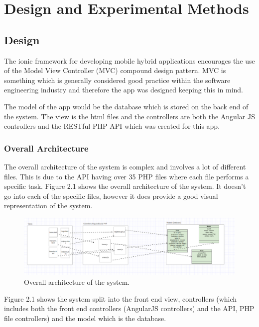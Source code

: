 \chapter{Design and Experimental Methods}
\section{Design}
The ionic framework for developing mobile hybrid applications encourages the use of the Model View Controller (MVC) compound design pattern. MVC is something which is generally considered good practice within the software engineering industry \cite{hybridcrap} and therefore the app was designed keeping this in mind.

The model of the app would be the database which is stored on the back end of the system. The view is the html files and the controllers are both the Angular JS controllers and the RESTful PHP API which was created for this app.

\subsection{Overall Architecture}
The overall architecture of the system is complex and involves a lot of different files. This is due to the API having over 35 PHP files where each file performs a specific task. Figure 2.1 shows the overall architecture of the system. It doesn't go into each of the specific files, however it does provide a good visual representation of the system.

\begin{center} 
\begin{figure}[H]
\includegraphics[width=\textwidth,height=\textheight,keepaspectratio]{images/overall}
\caption{Overall architecture of the system.}
\end{figure}
\end{center}

Figure 2.1 shows the system split into the front end view, controllers (which includes both the front end controllers (AngularJS controllers) and the API, PHP file controllers) and the model which is the database.

